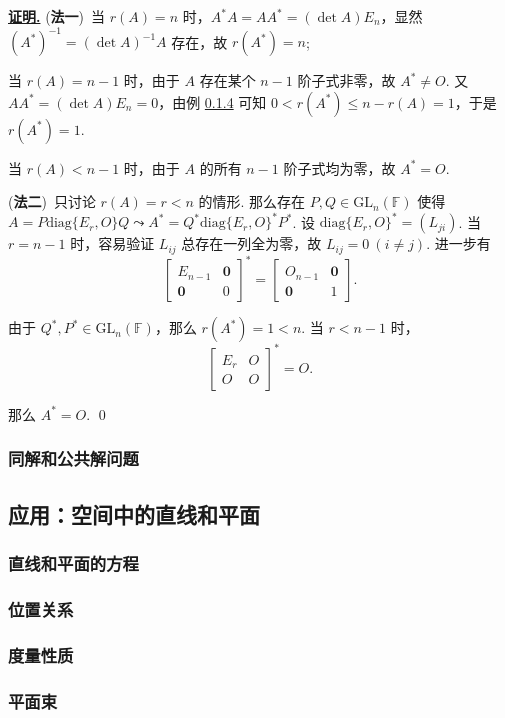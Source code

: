 \documentclass[10pt,openany]{article}
\theoremstyle{thmstyle} %
\theoremstyle{defstyle} %
\theoremstyle{prostyle} %
\theoremstyle{exastyle}
\theoremstyle{remstyle}
\renewenvironment{proof}[1][证明]{\par\underline{\textbf{#1.}} \;\fangsong}{\qed\par}
\newcommand{\gfn}{\text{GL}_n(\mathbb{F})}
\newcommand{\diag}{\mathrm{diag}}
\begin{document}
\begin{proof}
	(\textbf{法一})\ 当 \( r(A)=n \) 时，\( A^*A=AA^*=(\det A)E_n \)，显然 \( (A^*)^{-1}=(\det A)^{-1} A \) 存在，故 \( r(A^*)=n \); 
	
	当 \( r(A)=n-1 \) 时，由于 \( A \) 存在某个 \( n-1 \) 阶子式非零，故 \( A^* \neq O \). 又 \( AA^*=(\det A) E_n=0 \)，由例 \ref{} 可知 \( 0< r(A^*) \leq n-r(A)=1 \)，于是 \( r(A^*)=1 \).
	
	当 \( r(A)<n-1 \) 时，由于 \( A \) 的所有 \( n-1 \) 阶子式均为零，故 \( A^*=O \).
	
	(\textbf{法二})\  只讨论 \( r(A)=r<n \) 的情形. 那么存在 \( P,Q \in \gfn \) 使得 \( A=P\diag\{E_r,O\}Q \leadsto A^*=Q^* \diag\{E_r,O\}^* P^* \). 设 \( \diag\{E_r,O\}^*=(L_{ji}) \). 当 \( r=n-1 \) 时，容易验证 \( L_{ij} \) 总存在一列全为零，故 \( L_{ij}=0 \ (i \neq j) \). 进一步有
	\[ \begin{bmatrix}
		E_{n-1} & \bm{0} \\
		\bm{0} & 0
	\end{bmatrix}^*=\begin{bmatrix}
		O_{n-1} & \bm{0} \\
		\bm{0} & 1  
	\end{bmatrix}. \]
	
	由于 \( Q^*,P^* \in \gfn \)，那么 \( r(A^*)=1<n \). 当 \( r<n-1 \) 时，
	\[ \begin{bmatrix}
		E_r & O \\
		O & O
	\end{bmatrix}^*=O. \]
	
	那么 \( A^*=O \). 
\end{proof}




\subsubsection{同解和公共解问题}


\subsection{应用：空间中的直线和平面}


\subsubsection{直线和平面的方程}


\subsubsection{位置关系}


\subsubsection{度量性质}


\subsubsection{平面束}
\end{document}
